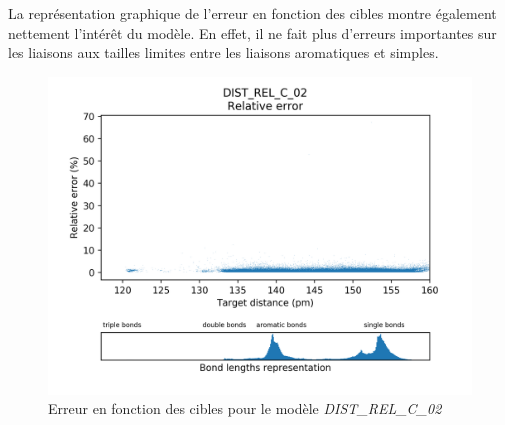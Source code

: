 \par La représentation graphique de l'erreur en fonction des cibles montre également nettement l'intérêt du modèle. En effet, il ne fait plus d'erreurs importantes sur les liaisons aux tailles limites entre les liaisons aromatiques et simples. \\

\begin{figure}[!h]
	\centering
	
	\includegraphics[scale=0.7]{../figures/DIST_REL_C_02/DIST_REL_C_02_distrib_rmse_dist.png}	
	
	\caption{Erreur en fonction des cibles pour le modèle \emph{DIST\_REL\_C\_02}}
	\end{figure}

